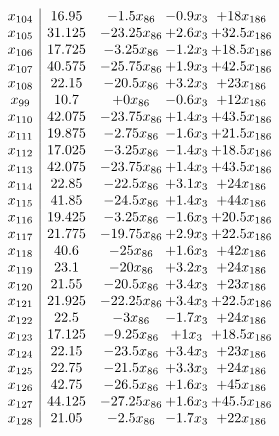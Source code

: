 \documentclass[11pt]{article}
\begin{document}
\[\begin{array}{c| c c@{\hskip 2pt} c@{\hskip 2pt} c@{\hskip 2pt} }
 x_{104}   &  16.95 & -1.5 x_{86} & -0.9 x_{3} & + 18 x_{186}\\
 x_{105}   &  31.125 & -23.25 x_{86} & + 2.6 x_{3} & + 32.5 x_{186}\\
 x_{106}   &  17.725 & -3.25 x_{86} & -1.2 x_{3} & + 18.5 x_{186}\\
 x_{107}   &  40.575 & -25.75 x_{86} & + 1.9 x_{3} & + 42.5 x_{186}\\
 x_{108}   &  22.15 & -20.5 x_{86} & + 3.2 x_{3} & + 23 x_{186}\\
 x_{99}   &  10.7 & + 0 x_{86} & -0.6 x_{3} & + 12 x_{186}\\
 x_{110}   &  42.075 & -23.75 x_{86} & + 1.4 x_{3} & + 43.5 x_{186}\\
 x_{111}   &  19.875 & -2.75 x_{86} & -1.6 x_{3} & + 21.5 x_{186}\\
 x_{112}   &  17.025 & -3.25 x_{86} & -1.4 x_{3} & + 18.5 x_{186}\\
 x_{113}   &  42.075 & -23.75 x_{86} & + 1.4 x_{3} & + 43.5 x_{186}\\
 x_{114}   &  22.85 & -22.5 x_{86} & + 3.1 x_{3} & + 24 x_{186}\\
 x_{115}   &  41.85 & -24.5 x_{86} & + 1.4 x_{3} & + 44 x_{186}\\
 x_{116}   &  19.425 & -3.25 x_{86} & -1.6 x_{3} & + 20.5 x_{186}\\
 x_{117}   &  21.775 & -19.75 x_{86} & + 2.9 x_{3} & + 22.5 x_{186}\\
 x_{118}   &  40.6 & -25 x_{86} & + 1.6 x_{3} & + 42 x_{186}\\
 x_{119}   &  23.1 & -20 x_{86} & + 3.2 x_{3} & + 24 x_{186}\\
 x_{120}   &  21.55 & -20.5 x_{86} & + 3.4 x_{3} & + 23 x_{186}\\
 x_{121}   &  21.925 & -22.25 x_{86} & + 3.4 x_{3} & + 22.5 x_{186}\\
 x_{122}   &  22.5 & -3 x_{86} & -1.7 x_{3} & + 24 x_{186}\\
 x_{123}   &  17.125 & -9.25 x_{86} & + 1 x_{3} & + 18.5 x_{186}\\
 x_{124}   &  22.15 & -23.5 x_{86} & + 3.4 x_{3} & + 23 x_{186}\\
 x_{125}   &  22.75 & -21.5 x_{86} & + 3.3 x_{3} & + 24 x_{186}\\
 x_{126}   &  42.75 & -26.5 x_{86} & + 1.6 x_{3} & + 45 x_{186}\\
 x_{127}   &  44.125 & -27.25 x_{86} & + 1.6 x_{3} & + 45.5 x_{186}\\
 x_{128}   &  21.05 & -2.5 x_{86} & -1.7 x_{3} & + 22 x_{186}\\

\end{array}\]
\end{document}
